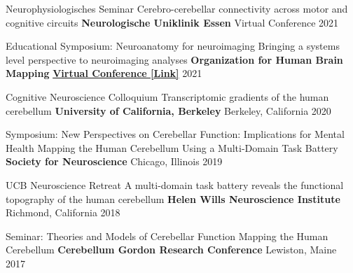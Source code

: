 

\begin{cventries}

  \cventry
    {Neurophysiologisches Seminar} %
    {Cerebro-cerebellar connectivity across motor and cognitive circuits} %
    {\textbf{Neurologische Uniklinik Essen}} %
    {Virtual Conference} %
    {2021} %

  \cventry
    {Educational Symposium: Neuroanatomy for neuroimaging} %
    {Bringing a systems level perspective to neuroimaging analyses} %
    {\textbf{Organization for Human Brain Mapping}} %
    { \href{https://www.youtube.com/watch?v=L6nwkvBqJzI}{\textbf{Virtual Conference [Link]}}} %
    {2021} %
    
  \cventry
    {Cognitive Neuroscience Colloquium} %
    {Transcriptomic gradients of the human cerebellum} %
    {\textbf{University of California, Berkeley}} %
    {Berkeley, California} %
    {2020} %

  \cventry
    {Symposium: New Perspectives on Cerebellar Function: Implications for Mental Health} %
    {Mapping the Human Cerebellum Using a Multi-Domain Task Battery} %
    {\textbf{Society for Neuroscience}} %
    {Chicago, Illinois} %
    {2019} %
    
  \cventry
    {UCB Neuroscience Retreat} %
    {A multi-domain task battery reveals the functional topography of the human cerebellum} %
    {\textbf{Helen Wills Neuroscience Institute}}
    {Richmond, California} %
    {2018} %
    
  \cventry
    {Seminar: Theories and Models of Cerebellar Function} %
    {Mapping the Human Cerebellum} %
    {\textbf{Cerebellum Gordon Research Conference}} %
    {Lewiston, Maine} %
    {2017} %
   
\end{cventries}
